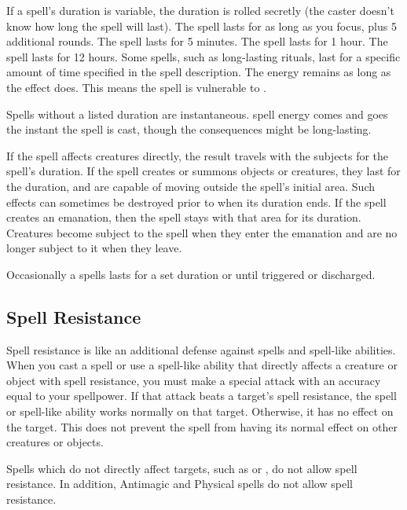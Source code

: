 If a spell's duration is variable, the duration is rolled secretly (the caster doesn't know how long the spell will last).
 The spell lasts for as long as you focus, plus 5 additional rounds.
 The spell lasts for 5 minutes.
 The spell lasts for 1 hour.
 The spell lasts for 12 hours.
 Some spells, such as long-lasting rituals, last for a specific amount of time specified in the spell description.
 The energy remains as long as the effect does. This means the spell is vulnerable to .

 Spells without a listed duration are instantaneous. spell energy comes and goes the instant the spell is cast, though the consequences might be long-lasting.

 If the spell affects creatures directly, the result travels with the subjects for the spell's duration. If the spell creates or summons objects or creatures, they last for the duration, and are capable of moving outside the spell's initial area. Such effects can sometimes be destroyed prior to when its duration ends. If the spell creates an emanation, then the spell stays with that area for its duration. Creatures become subject to the spell when they enter the emanation and are no longer subject to it when they leave.

 Occasionally a spells lasts for a set duration or until triggered or discharged.

\subsection{Spell Resistance}\label{Spell Resistance}
Spell resistance is like an additional defense against spells and spell-like abilities. When you cast a spell or use a spell-like ability that directly affects a creature or object with spell resistance, you must make a special attack with an accuracy equal to your spellpower. If that attack beats a target's spell resistance, the spell or spell-like ability works normally on that target. Otherwise, it has no effect on the target. This does not prevent the spell from having its normal effect on other creatures or objects.

Spells which do not directly affect targets, such as  or , do not allow spell resistance. In addition, Antimagic and Physical spells do not allow spell resistance.

